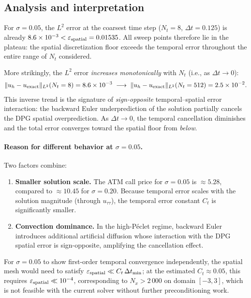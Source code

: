 \documentclass[11pt,a4paper]{article}
\newcommand{\Nx}{N_x}
\newcommand{\Nt}{N_t}
\newcommand{\dt}{\Delta t}
\newcommand{\eps}{\varepsilon}
\begin{document}
\subsection{Analysis and interpretation}

For $\sigma=0.05$, the $L^2$ error at the coarsest time step
($\Nt=8$, $\dt=0.125$) is already
$8.6\times10^{-3} < \eps_{\rm spatial} = 0.01535$.
All sweep points therefore lie in the plateau: the spatial
discretization floor exceeds the temporal error throughout the
entire range of $\Nt$ considered.

More strikingly, the $L^2$ error \emph{increases monotonically}
with $\Nt$ (i.e., as $\dt \to 0$):
\[
  \|u_h - u_{\rm exact}\|_{L^2}(\Nt=8) = 8.6\times10^{-3}
  \;\longrightarrow\;
  \|u_h - u_{\rm exact}\|_{L^2}(\Nt=512) = 2.5\times10^{-2}.
\]
This inverse trend is the signature of \emph{sign-opposite}
temporal--spatial error interaction: the backward Euler
underprediction of the solution partially cancels the DPG
spatial overprediction.  As $\dt\to0$, the temporal
cancellation diminishes and the total error converges toward
the spatial floor from \emph{below}.

\paragraph{Reason for different behavior at $\sigma=0.05$.}
Two factors combine:
\begin{enumerate}[noitemsep]
\item \textbf{Smaller solution scale.}  The ATM call price for
  $\sigma=0.05$ is $\approx 5.28$, compared to $\approx10.45$
  for $\sigma=0.20$.  Because temporal error scales with the
  solution magnitude (through $u_{\tau\tau}$), the temporal
  error constant $C_t$ is significantly smaller.
\item \textbf{Convection dominance.}  In the high-P\'{e}clet
  regime, backward Euler introduces additional artificial
  diffusion whose interaction with the DPG spatial error
  is sign-opposite, amplifying the cancellation effect.
\end{enumerate}
For $\sigma=0.05$ to show first-order temporal convergence
independently, the spatial mesh would need to satisfy
$\eps_{\rm spatial} \ll C_t\,\dt_{\rm min}$; at the estimated
$C_t \approx 0.05$, this requires
$\eps_{\rm spatial} \ll 10^{-4}$, corresponding to
$\Nx > 2\,000$ on domain $[-3,3]$, which is not feasible
with the current solver without further preconditioning work.

\end{document}
